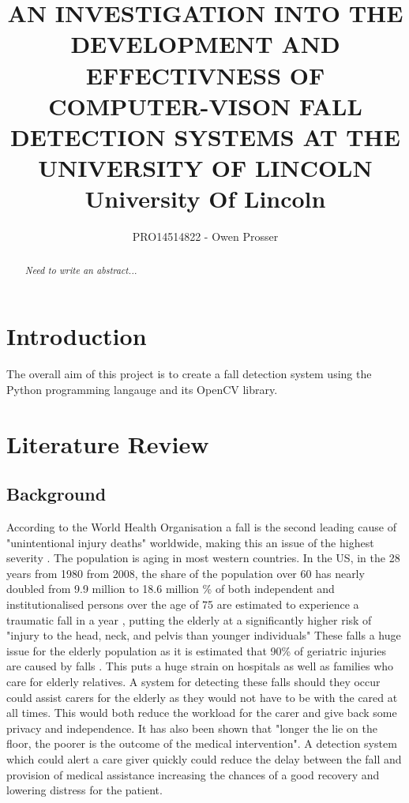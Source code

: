 \documentclass[11pt,a4paper]{report}
\title{
	{AN INVESTIGATION INTO THE DEVELOPMENT AND EFFECTIVNESS OF COMPUTER-VISON FALL DETECTION SYSTEMS AT THE UNIVERSITY OF LINCOLN}\\
	{\large University Of Lincoln}
}
\author{PRO14514822 - Owen Prosser}
\newcommand\blankpage{%
    \null
    \thispagestyle{empty}%
    \addtocounter{page}{-1}%
    \newpage}
\begin{document}
\maketitle

\begin{abstract}
\emph{Need to write an abstract...}
\end{abstract}


\tableofcontents


\chapter{Introduction}
The overall aim of this project is to create a fall detection system using the Python programming langauge and its OpenCV library.


\chapter{Literature Review} %
\section{Background}
According to the World Health Organisation a fall is the second leading cause of "unintentional injury deaths" worldwide, making this an issue of the highest severity \citep{Cruz_Fall_detection_wearable_device}. The population is aging in most western countries. In the US, in the 28 years from 1980 from 2008, the share of the population over 60 has nearly doubled from 9.9 million to 18.6 million \citep{Siracuse_Health_care_and_socioeconomic}\% of both independent and institutionalised persons over the age of 75 are estimated to experience a traumatic fall in a year \citep{Sixsmith_A_smart_sensor_to_detect}, putting the elderly at a significantly higher risk of "injury to the head, neck, and pelvis than younger individuals"  These falls a huge issue for the elderly population as it is estimated that 90\% of geriatric injuries are caused by falls \citep{boltz_Injuries_and_outcomes}. This puts a huge strain on hospitals as well as families who care for elderly relatives. A system for detecting these falls should they occur could assist carers for the elderly as they would not have to be with the cared at all times. This would both reduce the workload for the carer and give back some privacy and independence. It has also been shown that "longer the lie on the floor, the poorer is the outcome of the medical intervention"\citep{Li_A_microphone_array}. A detection system which could alert a care giver quickly could reduce the delay between the fall and provision of medical assistance increasing the chances of a good recovery and lowering distress for the patient.
\end{document}
